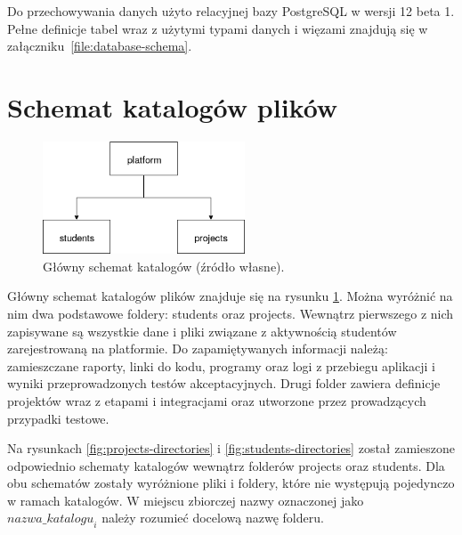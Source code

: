 Do przechowywania danych użyto relacyjnej bazy PostgreSQL w wersji 12 beta 1.
Pełne definicje tabel wraz z użytymi typami danych i więzami znajdują się w załączniku~\ref{file:database-schema}.


\section{Schemat katalogów plików}
\label{directories}

\begin{figure}[h]
    \centering
    \includegraphics[width = 6cm]{chapter02/platform_main_dirs.png}
    \caption{Główny schemat katalogów (źródło własne).}
    \label{fig:platform-main-directories}
\end{figure}

Główny schemat katalogów plików znajduje się na rysunku \ref{fig:platform-main-directories}.
Można wyróżnić na nim dwa podstawowe foldery: students oraz projects.
Wewnątrz pierwszego z nich zapisywane są wszystkie dane i pliki związane z aktywnością studentów zarejestrowaną na platformie.
Do zapamiętywanych informacji należą: zamieszczane raporty, linki do kodu, programy oraz logi z przebiegu aplikacji i wyniki przeprowadzonych testów akceptacyjnych.
Drugi folder zawiera definicje projektów wraz z etapami i integracjami oraz utworzone przez prowadzących przypadki testowe.

Na rysunkach \ref{fig:projects-directories} i \ref{fig:students-directories} został zamieszone odpowiednio schematy katalogów wewnątrz folderów projects oraz students.
Dla obu schematów zostały wyróżnione pliki i foldery, które nie występują pojedynczo w ramach katalogów.
W miejscu zbiorczej nazwy oznaczonej jako ${nazwa\_katalogu}_{i}$ należy rozumieć docelową nazwę folderu.

